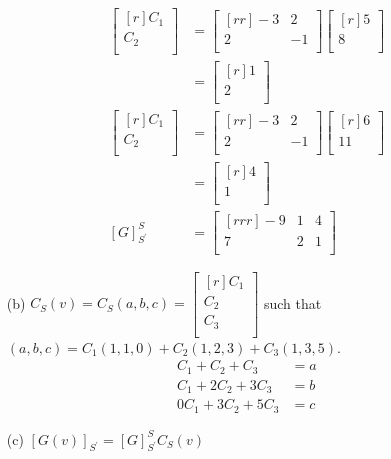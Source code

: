 \documentclass{report}
\theoremstyle{plain}
\theoremstyle{definition}
\theoremstyle{plain}
\begin{document}
\begin{enumerate}
\begin{align*}
\begin{bmatrix}[r]C_1\\C_2\\\end{bmatrix}&=\begin{bmatrix}[rr]-3&2\\2&-1\\\end{bmatrix}\begin{bmatrix}[r]5\\8\\\end{bmatrix}\\
&=\begin{bmatrix}[r]1\\2\\\end{bmatrix}\\
\begin{bmatrix}[r]C_1\\C_2\\\end{bmatrix}&=\begin{bmatrix}[rr]-3&2\\2&-1\\\end{bmatrix}\begin{bmatrix}[r]6\\11\\\end{bmatrix}\\
&=\begin{bmatrix}[r]4\\1\\\end{bmatrix}\\
[G]_{S^\prime}^S&=\begin{bmatrix}[rrr]-9&1&4\\7&2&1\\\end{bmatrix}
\end{align*}
\item[(b)]
$C_S(v)=C_S(a,b,c)=\begin{bmatrix}[r]C_1\\C_2\\C_3\\\end{bmatrix}$ such that $(a,b,c)=C_1(1,1,0)+C_2(1,2,3)+C_3(1,3,5)$.
\begin{align*}
C_1+C_2+C_3 &= a\\
C_1+2C_2+3C_3 &=b\\
0C_1+3C_2+5C_3&=c
\end{align*}
\item[(c)]
$[G(v)]_{S^\prime}=[G]_{S^\prime}^SC_S(v)$
\end{enumerate}
\end{document}
